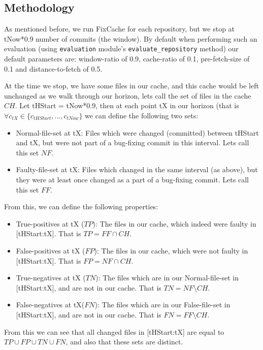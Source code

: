 \documentclass[12pt,twoside,notitlepage]{report}
\newcommand{\fxch}{FixCache}
\begin{document}
\subsection{Methodology}
As mentioned before, we run \fxch{} for each repository, but we stop at tNow*0.9 number of commits (the window). By default when performing such an evaluation (using \texttt{evaluation} module's \texttt{evaluate\_repository} method) our default parameters are: window-ratio of 0.9, cache-ratio of 0.1, pre-fetch-size of 0.1 and distance-to-fetch of 0.5.

At the time we stop, we have some files in our cache, and this cache would be left unchanged as we walk through our horizon, lets call the set of files in the cache $CH$. Let tHStart = tNow*0.9, then at each point tX in our horizon (that is $\forall c_{tX} \in \{c_{tHStart}, \dots, c_{tNow}\}$ we can define the following two sets:
\begin{itemize}
\item Normal-file-set at tX: Files which were changed (committed) between tHStart and tX, but were not part of a bug-fixing commit in this interval. Lets call this set $NF$.
\item Faulty-file-set at tX: Files which changed in the same interval (as above), but they were at least once changed as a part of a bug-fixing commit. Lets call this set $FF$.
\end{itemize}

From this, we can define the following properties:
\begin{itemize}
\item True-positives at tX ($TP$): The files in our cache, which indeed were faulty in [tHStart:tX]. That is $TP = FF \cap CH$.
\item False-positives at tX ($FP$): The files in our cache, which were not faulty in [tHStart:tX]. That is $FP = NF \cap CH$.
\item True-negatives at tX ($TN$): The files which are in our Normal-file-set in [tHStart:tX], and are not in our cache. That is $TN = NF \setminus CH$.
\item False-negatives at tX($FN$): The files which are in our False-file-set in [tHStart:tX], and are not in our cache. That is $FN = FF \setminus CH$.
\end{itemize}
From this we can see that all changed files in [tHStart:tX] are equal to $TP \cup FP \cup TN \cup FN$, and also that these sets are distinct.
\end{document}
